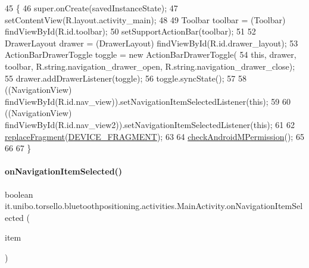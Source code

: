 \begin{DoxyCode}
45                                                        \{
46         super.onCreate(savedInstanceState);
47         setContentView(R.layout.activity\_main);
48 
49         Toolbar toolbar = (Toolbar) findViewById(R.id.toolbar);
50         setSupportActionBar(toolbar);
51 
52         DrawerLayout drawer = (DrawerLayout) findViewById(R.id.drawer\_layout);
53         ActionBarDrawerToggle toggle = \textcolor{keyword}{new} ActionBarDrawerToggle(
54                 \textcolor{keyword}{this}, drawer, toolbar, R.string.navigation\_drawer\_open, R.string.navigation\_drawer\_close);
55         drawer.addDrawerListener(toggle);
56         toggle.syncState();
57 
58         ((NavigationView) findViewById(R.id.nav\_view)).setNavigationItemSelectedListener(\textcolor{keyword}{this});
59 
60         ((NavigationView) findViewById(R.id.nav\_view2)).setNavigationItemSelectedListener(\textcolor{keyword}{this});
61 
62         \hyperlink{classit_1_1unibo_1_1torsello_1_1bluetoothpositioning_1_1activities_1_1MainActivity_a98db4478d28cd91118138d0b652ceb2c_a98db4478d28cd91118138d0b652ceb2c}{replaceFragment}(\hyperlink{classit_1_1unibo_1_1torsello_1_1bluetoothpositioning_1_1activities_1_1MainActivity_a2f77c0245ac2525dc58905e38e1817d1_a2f77c0245ac2525dc58905e38e1817d1}{DEVICE\_FRAGMENT});
63 
64         \hyperlink{classit_1_1unibo_1_1torsello_1_1bluetoothpositioning_1_1activities_1_1MainActivity_ab762aac3d11f5b0ccc6042a140804d5d_ab762aac3d11f5b0ccc6042a140804d5d}{checkAndroidMPermission}();
65 
66 
67     \}
\end{DoxyCode}
\hypertarget{classit_1_1unibo_1_1torsello_1_1bluetoothpositioning_1_1activities_1_1MainActivity_a7cfc0a2ee94c12afaac3b7472eeb75b7_a7cfc0a2ee94c12afaac3b7472eeb75b7}{}\label{classit_1_1unibo_1_1torsello_1_1bluetoothpositioning_1_1activities_1_1MainActivity_a7cfc0a2ee94c12afaac3b7472eeb75b7_a7cfc0a2ee94c12afaac3b7472eeb75b7} 
\paragraph{\texorpdfstring{on\+Navigation\+Item\+Selected()}{onNavigationItemSelected()}}
{\footnotesize\ttfamily boolean it.\+unibo.\+torsello.\+bluetoothpositioning.\+activities.\+Main\+Activity.\+on\+Navigation\+Item\+Selected (\begin{DoxyParamCaption}\item[{Menu\+Item}]{item }\end{DoxyParamCaption})}


